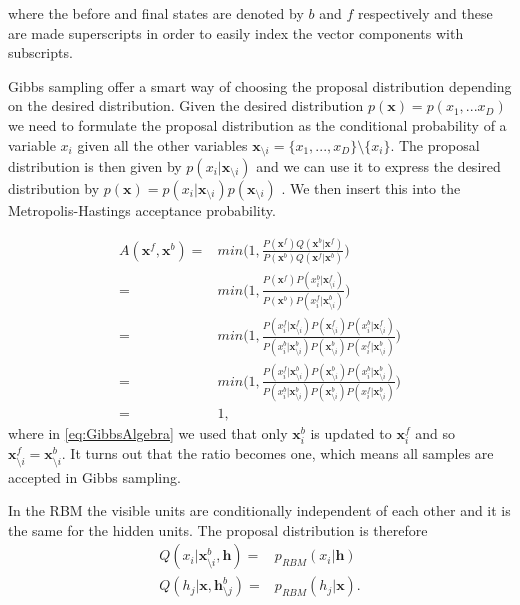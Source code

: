 where the before and final states are denoted by $b$ and $f$ respectively and these are made superscripts in order to easily index the vector components with subscripts.

Gibbs sampling offer a smart way of choosing the proposal distribution depending on the desired distribution. Given the desired distribution $p(\bm{x}) = p(x_1, ...x_D)$ we need to formulate the proposal distribution as the conditional probability of a variable $x_i$ given all the other variables $\bm{x}_{\setminus i} = \{ x_1, ..., x_D \} \setminus \{x_i\}$.
The proposal distribution is then given by $p(x_i | \bm{x}_{\setminus i})$ and we can use it to express the desired distribution by $p(\bm{x}) = p(x_i | \bm{x}_{\setminus i}) p(\bm{x}_{\setminus i})$ . We then insert this into the Metropolis-Hastings acceptance probability. 

\begin{align}
	A(\bm{x}^f, \bm{x}^b) =& min \Big(1,  \frac{  P(\bm{x}^f) Q(\bm{x}^b| \bm{x}^f) }
	{  P(\bm{x}^b) Q(\bm{x}^f| \bm{x}^b)  }  \Big) \\
	=& min \Big(1,  \frac{  P(\bm{x}^f) P(x_i^b| \bm{x}_{\setminus i}^f) }
	{  P(\bm{x}^b) P(x_i^f| \bm{x}_{\setminus i}^b)  }  \Big) \\
	=& min \Big(1,  \frac{ P(x_i^f| \bm{x}_{\setminus i}^f)  P(\bm{x}_{\setminus i}^f) P(x_i^b| \bm{x}_{\setminus i}^f) }
	{   P(x_i^b| \bm{x}_{\setminus i}^b) P(\bm{x}_{\setminus i}^b) P(x_i^f| \bm{x}_{\setminus i}^b)  }  \Big) \\
	=& min \Big(1,  \frac{ P(x_i^f| \bm{x}_{\setminus i}^b)  P(\bm{x}_{\setminus i}^b) P(x_i^b| \bm{x}_{\setminus i}^b) }
	{   P(x_i^b| \bm{x}_{\setminus i}^b) P(\bm{x}_{\setminus i}^b) P(x_i^f| \bm{x}_{\setminus i}^b)  }  \Big) \\ \label{eq:GibbsAlgebra}
	=& 1,
\end{align}
where in \ref{eq:GibbsAlgebra} we used that only $\bm{x}_i^b$ is updated to $\bm{x}_i^f$ and so $\bm{x}_{\setminus i}^f = \bm{x}_{\setminus i}^b$. It turns out that the ratio becomes one, which means all samples are accepted in Gibbs sampling.

In the RBM the visible units are conditionally independent of each other and it is the same for the hidden units. The proposal distribution is therefore
\begin{align}
	Q(x_i | \bm{x}_{\setminus i}^b, \bm{h}) =& p_{RBM} (x_i |\bm{h}) \\
	Q(h_j | \bm{x}, \bm{h}_{\setminus j}^b) =& p_{RBM} (h_j |\bm{x}). 
\end{align}







